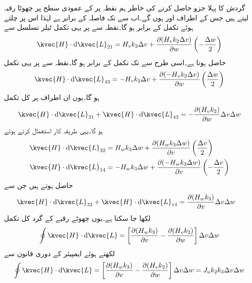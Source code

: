 گردش کا پہلا جزو حاصل کرنے کی خاطر ہم نقطہ  پر  کے عمودی سطح پر چھوٹا رقبہ لیتے ہیں جس کے اطراف  اور  ہوں گے۔اب  سے  تک فاصلہ  کے برابر ہے لہٰذا اس پر چلتے ہوئے  تکمل  کے برابر ہو گا۔نقطہ  سے   پر یہی تکمل ٹیلر تسلسل سے
\begin{align*}
\kvec{H} \cdot \dif \kvec{L}_{21}=H_v k_2 \Delta v+\frac{\partial (H_v k_2 \Delta v)}{\partial w}\left(-\frac{\Delta w}{2}\right)
\end{align*}
حاصل ہوتا ہے۔اسی طرح  سے  تک  تکمل  کے برابر ہو گا۔نقطہ  سے   پر یہی تکمل
\begin{align*}
\kvec{H} \cdot \dif \kvec{L}_{43}=-H_v k_2 \Delta v+\frac{\partial (-H_v k_2 \Delta v)}{\partial w}\left(\frac{\Delta w}{2}\right)
\end{align*}
ہو گا۔یوں ان اطراف پر کل تکمل
\begin{align}
\kvec{H} \cdot \dif \kvec{L}_{21}+\kvec{H} \cdot \dif \kvec{L}_{43}=-\frac{\partial (H_v k_2)}{\partial w} \Delta v\Delta w
\end{align}
ہو گا۔یہی طریقہ کار استعمال کرتے ہوئے
\begin{align*}
\kvec{H} \cdot \dif \kvec{L}_{32}&=H_w k_3 \Delta w+\frac{\partial (H_w k_3 \Delta w)}{\partial v}\left(\frac{\Delta v}{2}\right)\\
\kvec{H} \cdot \dif \kvec{L}_{14}&=-H_w k_3 \Delta w+\frac{\partial (-H_w k_3 \Delta w)}{\partial v}\left(-\frac{\Delta v}{2}\right)
\end{align*}
حاصل ہوتے ہیں جن سے
\begin{align}
\kvec{H} \cdot \dif \kvec{L}_{32}+\kvec{H} \cdot \dif \kvec{L}_{14}&=\frac{\partial (H_w k_3)}{\partial v}\Delta v  \Delta w
\end{align}
لکھا جا سکتا ہے۔یوں چھوٹے رقبے کے گرد کل تکمل
\begin{align}
\oint \kvec{H} \cdot \dif \kvec{L}=\left[\frac{\partial (H_w k_3)}{\partial v}-\frac{\partial (H_v k_2)}{\partial w} \right]\Delta v  \Delta w
\end{align}
لکھتے ہوئے ایمپیئر کے دوری قانون سے
\begin{align*}
\oint \kvec{H} \cdot \dif \kvec{L}=\left[\frac{\partial (H_w k_3)}{\partial v}-\frac{\partial (H_v k_2)}{\partial w} \right]\Delta v  \Delta w=J_u {k_2 k_3 \Delta v \Delta w}
\end{align*}
